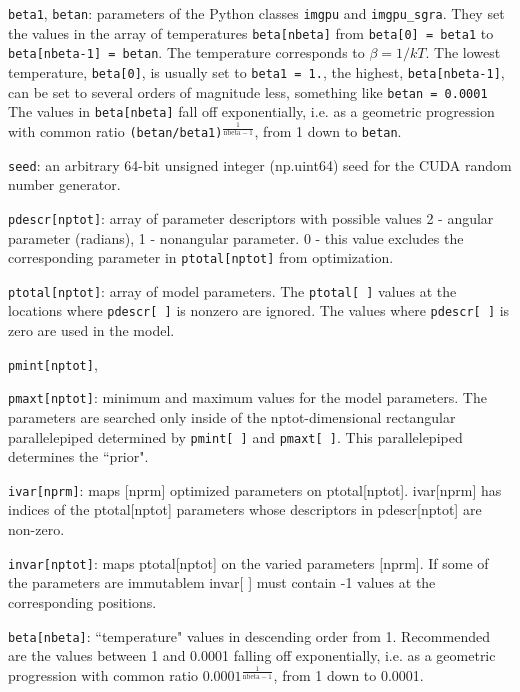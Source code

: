 \documentclass[preprint2]{aastex}
\begin{document}
\verb|beta1|, \verb|betan|: parameters of the Python classes \verb|imgpu| and \verb|imgpu_sgra|. 
	        They set the values in the array of temperatures \verb|beta[nbeta]| from \verb|beta[0] = beta1| 
            to \verb|beta[nbeta-1] = betan|. The temperature corresponds to $\beta = 1/{kT}$.
	        The lowest temperature, \verb|beta[0]|, is usually set to \verb|beta1 = 1.|, 
	        the highest, \verb|beta[nbeta-1]|, can be set to several orders of 
	        magnitude less, something like \verb|betan = 0.0001|
	        The values in \verb|beta[nbeta]| fall off exponentially, i.e. as a geometric progression 
	        with common ratio \verb|(betan/beta1)|$^\frac{1}{\mathrm{nbeta-1}}$, from 1 down to \verb|betan|.

\verb|seed|: an arbitrary 64-bit unsigned integer (np.uint64) seed for the CUDA
      random number generator. 

\verb|pdescr[nptot]|: array of parameter descriptors with possible values
               2 - angular parameter (radians), 1 - nonangular parameter.
               0 - this value excludes the corresponding parameter in
                   \verb|ptotal[nptot]| from optimization.
                   
\verb|ptotal[nptot]|: array of model parameters. The \verb|ptotal[ ]| values at
               the locations where \verb|pdescr[ ]| is nonzero are ignored.
               The values where \verb|pdescr[ ]| is zero are used in the model.
               
\verb|pmint[nptot]|,

\verb|pmaxt[nptot]|: minimum and maximum values for the model parameters.
              The parameters are searched only inside of the
              nptot-dimensional rectangular parallelepiped determined by
              \verb|pmint[ ]| and \verb|pmaxt[ ]|. This parallelepiped determines the
             ``prior".

\verb|ivar[nprm]|: maps [nprm] optimized parameters on ptotal[nptot].
            ivar[nprm] has indices of the ptotal[nptot] parameters whose
            descriptors in pdescr[nptot] are non-zero.

\verb|invar[nptot]|: maps ptotal[nptot] on the varied parameters [nprm]. If some
              of the parameters are immutablem invar[ ] must contain -1 values
              at the corresponding positions.

\verb|beta[nbeta]|: ``temperature" values in descending order from 1. Recommended are
             the values between 1 and 0.0001 falling off exponentially, i.e. as a geometric progression
	         with common ratio $0.0001^\frac{1}{\mathrm{nbeta-1}}$, from 1 down to 0.0001.
\end{document}

